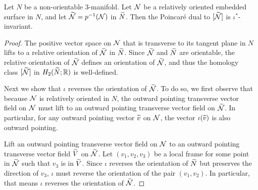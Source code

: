 \begin{lem}
  \label{lem:PD1}
 Let $N$ be a non-orientable 3-manifold.  %
  Let $\mathcal{N}$ be a relatively oriented embedded surface in $N$, and let $\widetilde{\mathcal{N}}=p^{-1}(\mathcal{N})$ in $\widetilde{N}$.
  Then the Poincar\'e dual to $[\widetilde{\mathcal{N}}]$ is $\iota^{\ast}$-invariant.%
\end{lem}
\begin{proof}
  The positive vector space on $\mathcal{N}$ that is transverse to its tangent plane in $N$ lifts to a relative orientation of $\widetilde{\mathcal{N}}$ in $\widetilde{N}$.
  Since $\widetilde{\mathcal{N}}$ and $\widetilde{N}$ are orientable, the relative orientation of $\widetilde{\mathcal{N}}$ defines an orientation of $\widetilde{\mathcal{N}}$, and thus the homology class $[\widetilde{\mathcal{N}}]$ in $H_2(\widetilde{N};\mathbb{R})$ is well-defined.

  Next we show that $\iota$ reverses the orientation of $\widetilde{\mathcal{N}}$.  To do so, we first observe that because $\mathcal{N}$ is relatively oriented in $N$, the outward pointing transverse vector field on ${\mathcal{N}}$ must lift to an outward pointing transverse vector field on $\widetilde{\mathcal{N}}$.  In particular, for any outward pointing vector $\widetilde{v}$ on $\mathcal{N}$, the vector $\iota(\widetilde{v})$ is also outward pointing.%

  Lift an outward pointing transverse vector field on $\mathcal{N}$ to an outward pointing transverse vector field $\widetilde{V}$ on $\widetilde{\mathcal{N}}$.  Let $(v_1, v_2, v_3)$ be a local frame for some point in $\widetilde{\mathcal{N}}$ such that
  $v_3$ is in $\widetilde{V}$.
  Since $\iota$ reverses the orientation of $\widetilde{N}$ but preserves the direction of $v_3$, $\iota$ must reverse the orientation of the pair $(v_1, v_2)$.
  In particular, that means $\iota$ reverses the orientation of $\widetilde{\mathcal{N}}$.


\end{proof}
